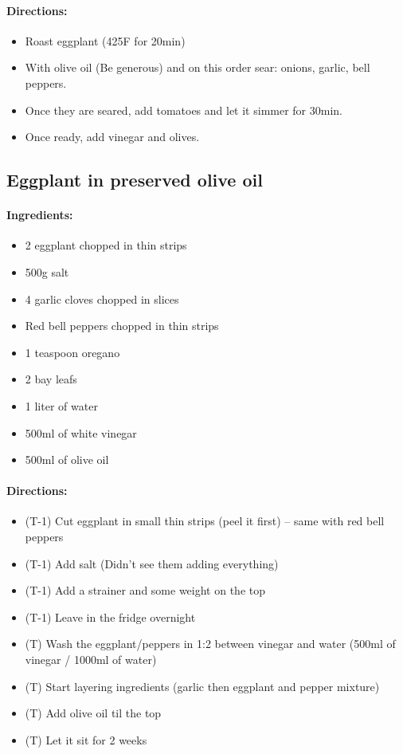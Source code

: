 \documentclass{article}
\begin{document}
\paragraph{Directions:}
\begin{itemize}
	\item Roast eggplant (425F for 20min)
	\item With olive oil (Be generous) and on this order sear: onions, garlic, bell peppers.
	\item Once they are seared, add tomatoes and let it simmer for 30min.
	\item Once ready, add vinegar and olives.
\end{itemize}

\subsection{Eggplant in preserved olive oil}{}

\paragraph{Ingredients:}

\begin{itemize}
	\item 2 eggplant chopped in thin strips
	\item 500g salt
	\item 4 garlic cloves chopped in slices
	\item Red bell peppers chopped in thin strips
	\item 1 teaspoon oregano
	\item 2 bay leafs
	\item 1 liter of water
	\item 500ml of white vinegar
	\item 500ml of olive oil
\end{itemize}

\paragraph{Directions:}
\begin{itemize}
	\item (T-1) Cut eggplant in small thin strips (peel it first) -- same with red bell peppers
	\item (T-1) Add salt (Didn't see them adding everything)
	\item (T-1) Add a strainer and some weight on the top
	\item (T-1) Leave in the fridge overnight
	\item (T) Wash the eggplant/peppers in 1:2 between vinegar and water (500ml of vinegar / 1000ml of water)
	\item (T) Start layering ingredients (garlic then eggplant and pepper mixture)
	\item (T) Add olive oil til the top
	\item (T) Let it sit for 2 weeks
\end{itemize}
\end{document}
